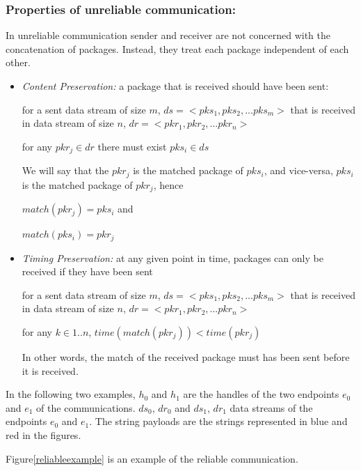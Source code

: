 \subsubsection{Properties of unreliable communication:}
In unreliable communication sender and receiver are not concerned with the concatenation of packages. Instead, they treat each package independent of each other.
\begin{itemize}
 \item \textit{ Content Preservation:} a package that is received should have been sent:

for a sent data stream of size $m$, $ds= <pks_1, pks_2, ... pks_m>$ that is received in data stream of size $n$, $dr = <pkr_1, pkr_2, ... pkr_n>$

for any $pkr_j \in dr$ there must exist $pks_i \in ds$

We will say that the $pkr_j$ is the matched package of $pks_i$, and vice-versa, $pks_i$ is the matched package of $pkr_j$, hence

$match(pkr_j) = pks_i$  and

$match(pks_i) = pkr_j$

 \item \textit{Timing Preservation:}  at any given point in time, packages can only be received if they have been sent

  for a sent data stream of size $m$, $ds= <pks_1, pks_2, ... pks_m>$ that is received in data stream of size $n$, $dr = <pkr_1, pkr_2, ... pkr_n>$

  for any $k \in {1..n}$, $time(match(pkr_j)) < time(pkr_j)$

In other words, the match of the received package must has been sent before it is received.

\end{itemize}



In the following two examples, $h_0$ and $h_1$ are the handles of the two endpoints $e_0$ and $e_1$ of the communications. $ds_0$, $dr_0$ and $ds_1$, $dr_1$ data streams of the endpoints $e_0$ and $e_1$. The string payloads are the strings represented in blue and red in the figures. 

Figure\ref{reliableexample} is an example of the reliable communication. 

